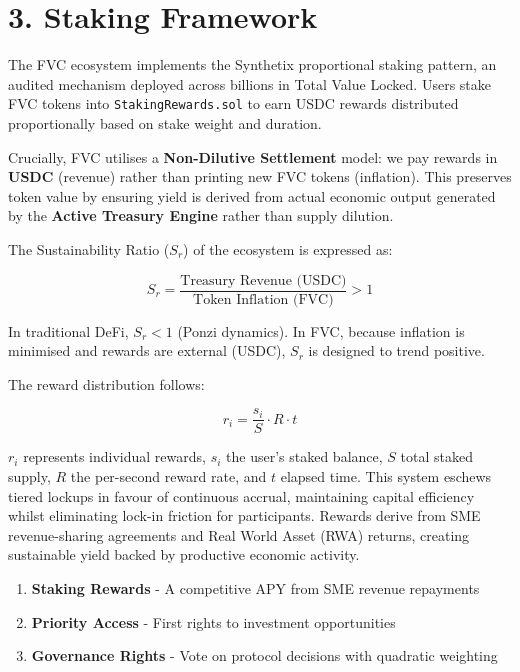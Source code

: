 \documentclass[
  paper=a4,
  ,captions=tableheading
]{scrartcl}
\begin{document}
\section{3. Staking Framework}\label{staking-framework}

The FVC ecosystem implements the Synthetix proportional staking pattern, an audited mechanism deployed across billions in Total Value Locked. Users stake FVC tokens into \texttt{StakingRewards.sol} to earn USDC rewards distributed proportionally based on stake weight and duration.

Crucially, FVC utilises a \textbf{Non-Dilutive Settlement} model: we pay rewards in \textbf{USDC} (revenue) rather than printing new FVC tokens (inflation). This preserves token value by ensuring yield is derived from actual economic output generated by the \textbf{Active Treasury Engine} rather than supply dilution.

The Sustainability Ratio ($S_r$) of the ecosystem is expressed as:

\[
S_r = \frac{\text{Treasury Revenue (USDC)}}{\text{Token Inflation (FVC)}} > 1
\]

In traditional DeFi, $S_r < 1$ (Ponzi dynamics). In FVC, because inflation is minimised and rewards are external (USDC), $S_r$ is designed to trend positive.

The reward distribution follows:

\[
r_i = \frac{s_i}{S} \cdot R \cdot t
\]

$r_i$ represents individual rewards, $s_i$ the user's staked balance, $S$ total staked supply, $R$ the per-second reward rate, and $t$ elapsed time. This system eschews tiered lockups in favour of continuous accrual, maintaining capital efficiency whilst eliminating lock-in friction for participants. Rewards derive from SME revenue-sharing agreements and Real World Asset (RWA) returns, creating sustainable yield backed by productive economic activity.

\begin{samepage}
\begin{enumerate}
    \item{\textbf{Staking Rewards}} - A competitive APY from SME revenue repayments
    \item{\textbf{Priority Access}} - First rights to investment opportunities
    \item{\textbf{Governance Rights}} - Vote on protocol decisions with quadratic weighting
\end{enumerate}
\end{samepage}
\end{document}
